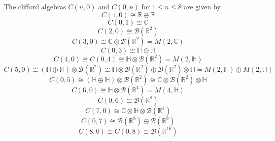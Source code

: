 \documentclass[aps,preprint]{revtex4}%
\begin{document}
The clifford algebras $C\left(  n,0\right)  $ and $C\left(  0,n\right)  $ for
$1\leq n\leq8$ are given by
\begin{equation}
C\left(  1,0\right)  \cong\mathbb{R\oplus R}%
\end{equation}%
\begin{equation}
C\left(  0,1\right)  \cong\mathbb{C}%
\end{equation}%
\begin{equation}
C\left(  2,0\right)  \cong\mathcal{B}\left(  \mathbb{R}^{2}\right)
\end{equation}%
\begin{equation}
C\left(  3,0\right)  \cong\mathbb{C}\otimes\mathcal{B}\left(  \mathbb{R}%
^{2}\right)  =M\left(  2,\mathbb{C}\right)
\end{equation}%
\begin{equation}
C\left(  0,3\right)  \cong\mathbb{H\oplus H}%
\end{equation}%
\begin{equation}
C\left(  4,0\right)  \cong C\left(  0,4\right)  \cong\mathbb{H}\otimes
\mathcal{B}\left(  \mathbb{R}^{2}\right)  =M\left(  2,\mathbb{H}\right)
\end{equation}%
\begin{equation}
C\left(  5,0\right)  \cong\left(  \mathbb{H\oplus H}\right)  \otimes
\mathcal{B}\left(  \mathbb{R}^{2}\right)  \cong\mathbb{H}\otimes
\mathcal{B}\left(  \mathbb{R}^{2}\right)  \oplus\mathcal{B}\left(
\mathbb{R}^{2}\right)  \otimes\mathbb{H}=M\left(  2,\mathbb{H}\right)  \oplus
M\left(  2,\mathbb{H}\right)
\end{equation}%
\begin{equation}
C\left(  0,5\right)  \cong\left(  \mathbb{H\oplus H}\right)  \otimes
\mathcal{B}\left(  \mathbb{R}^{2}\right)  \cong\mathbb{C}\otimes
\mathcal{B}\left(  \mathbb{R}^{2}\right)  \otimes\mathbb{H}%
\end{equation}%
\begin{equation}
C\left(  6,0\right)  \cong\mathbb{H}\otimes\mathcal{B}\left(  \mathbb{R}%
^{4}\right)  =M\left(  4,\mathbb{H}\right)
\end{equation}%
\begin{equation}
C\left(  0,6\right)  \cong\mathcal{B}\left(  \mathbb{R}^{8}\right)
\end{equation}%
\begin{equation}
C\left(  7,0\right)  \cong\mathbb{C\otimes H}\otimes\mathcal{B}\left(
\mathbb{R}^{4}\right)
\end{equation}%
\begin{equation}
C\left(  0,7\right)  \cong\mathcal{B}\left(  \mathbb{R}^{8}\right)
\oplus\mathcal{B}\left(  \mathbb{R}^{8}\right)
\end{equation}%
\begin{equation}
C\left(  8,0\right)  \cong C\left(  0,8\right)  \cong\mathcal{B}\left(
\mathbb{R}^{16}\right)
\end{equation}
\end{document}
